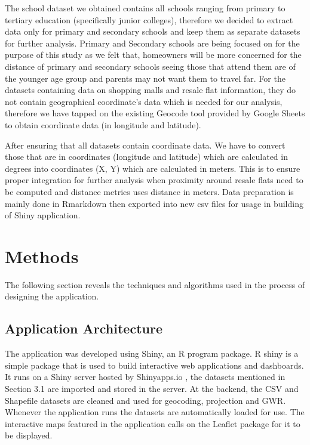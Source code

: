 \documentclass{acm_proc_article-sp}
\begin{document}
The school dataset we obtained contains all schools ranging from primary
to tertiary education (specifically junior colleges), therefore we
decided to extract data only for primary and secondary schools and keep
them as separate datasets for further analysis. Primary and Secondary
schools are being focused on for the purpose of this study as we felt
that, homeowners will be more concerned for the distance of primary and
secondary schools seeing those that attend them are of the younger age
group and parents may not want them to travel far. For the datasets
containing data on shopping malls and resale flat information, they do
not contain geographical coordinate's data which is needed for our
analysis, therefore we have tapped on the existing Geocode tool provided
by Google Sheets to obtain coordinate data (in longitude and latitude).

After ensuring that all datasets contain coordinate data. We have to
convert those that are in coordinates (longitude and latitude) which are
calculated in degrees into coordinates (X, Y) which are calculated in
meters. This is to ensure proper integration for further analysis when
proximity around resale flats need to be computed and distance metrics
uses distance in meters. Data preparation is mainly done in Rmarkdown
then exported into new csv files for usage in building of Shiny
application.

\hypertarget{methods}{%
\section{Methods}\label{methods}}

The following section reveals the techniques and algorithms used in the
process of designing the application.

\hypertarget{application-architecture}{%
\subsection{Application Architecture}\label{application-architecture}}

The application was developed using Shiny, an R program package. R shiny
is a simple package that is used to build interactive web applications
and dashboards. It runs on a Shiny server hosted by Shinyapps.io , the
datasets mentioned in Section 3.1 are imported and stored in the server.
At the backend, the CSV and Shapefile datasets are cleaned and used for
geocoding, projection and GWR. Whenever the application runs the
datasets are automatically loaded for use. The interactive maps featured
in the application calls on the Leaflet package for it to be
displayed.\\
\end{document}
